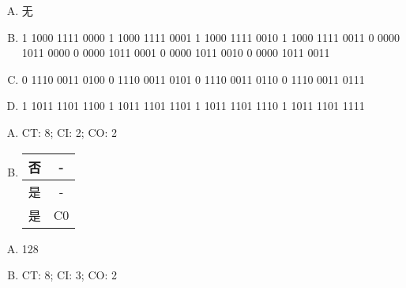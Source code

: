 {    %
    \begin{practicec}
        \begin{enumerate}[A.]
            \item
            {
                无
            }
            \item
            {
                1 1000 1111 0000
                1 1000 1111 0001
                1 1000 1111 0010
                1 1000 1111 0011
                0 0000 1011 0000
                0 0000 1011 0001
                0 0000 1011 0010
                0 0000 1011 0011
            }
            \item
            {
                0 1110 0011 0100
                0 1110 0011 0101
                0 1110 0011 0110
                0 1110 0011 0111
            }
            \item
            {
                1 1011 1101 1100
                1 1011 1101 1101
                1 1011 1101 1110
                1 1011 1101 1111
            }
        \end{enumerate}
    \end{practicec}

    \begin{practicec}
        \begin{enumerate}[A.]
            \item CT: 8; CI: 2; CO: 2
            \item
            {
                \begin{table}[htb]
                    \begin{tabular}{|c|c|}
                        \hline
                        否 & - \\
                        \hline
                        是 & - \\
                        \hline
                        是 & C0 \\
                        \hline
                    \end{tabular}
                \end{table}
            }
        \end{enumerate}
    \end{practicec}

    \begin{practicec}
        \begin{enumerate}[A.]
            \item 128
            \item CT: 8; CI: 3; CO: 2
        \end{enumerate}
    \end{practicec}

}
